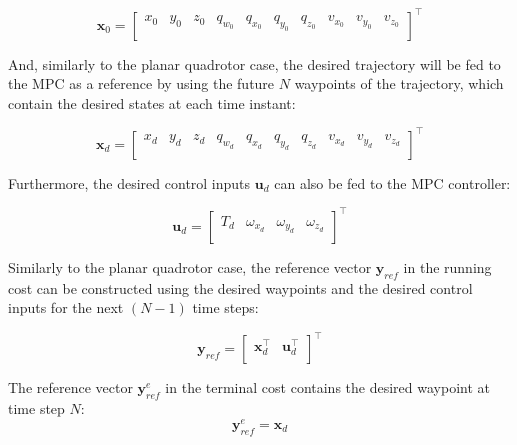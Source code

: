 \documentclass{thesisreport}
\begin{document}
\begin{equation}
	\bm{x}_0 = \begin{bmatrix}
		x_0 & y_0 & z_0 & q_{w_0} & q_{x_0} & q_{y_0} & q_{z_0} & v_{x_0} & v_{y_0} & v_{z_0}\\
	\end{bmatrix}^{\intercal}
\end{equation}

And, similarly to the planar quadrotor case, the desired trajectory will be fed to the MPC as a reference by using the future $N$ waypoints of the trajectory, which contain the desired states at each time instant:

\begin{equation}
	\bm{x}_d = \begin{bmatrix}
		x_d & y_d & z_d & q_{w_d} & q_{x_d} & q_{y_d} & q_{z_d} & v_{x_d} & v_{y_d} & v_{z_d}\\
	\end{bmatrix}^{\intercal}
\end{equation}







Furthermore, the desired control inputs $\bm{u}_d$ can also be fed to the MPC controller:


\begin{equation}
	\bm{u}_d = \begin{bmatrix}
		T_d & \omega_{x_d} & \omega_{y_d} & \omega_{z_d} \\
	\end{bmatrix}^{\intercal}
\end{equation}

 Similarly to the planar quadrotor case, the reference vector $\bm{y}_{ref}$ in the running cost can be constructed using the desired waypoints and the desired control inputs for the next $(N-1)$ time steps:

\begin{equation}
	\bm{y}_{ref} = \begin{bmatrix}
		\bm{x}_d^{\intercal} & \bm{u}_d^{\intercal} \\
	\end{bmatrix}^{\intercal}
\end{equation}

The reference vector $\bm{y}_{ref}^e$ in the terminal cost contains the desired waypoint at time step $N$:
\begin{equation}
	\bm{y}_{ref}^e = \bm{x}_d
\end{equation}
\end{document}
